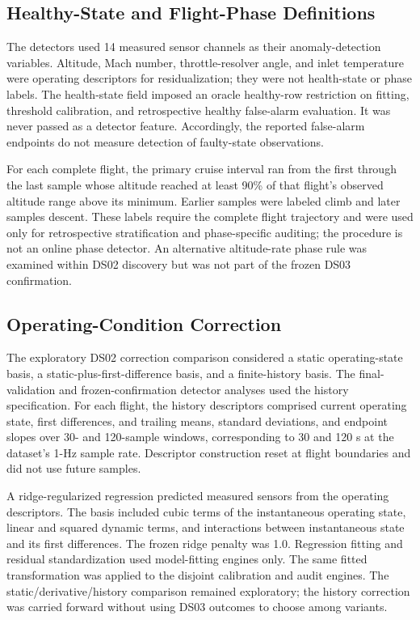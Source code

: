 \documentclass[10pt,conference]{IEEEtran}
\begin{document}
\subsection{Healthy-State and Flight-Phase Definitions}\label{healthy-state-and-flight-phase-definitions}

The detectors used 14 measured sensor channels as their anomaly-detection variables. Altitude, Mach number, throttle-resolver angle, and inlet temperature were operating descriptors for residualization; they were not health-state or phase labels. The health-state field imposed an oracle healthy-row restriction on fitting, threshold calibration, and retrospective healthy false-alarm evaluation. It was never passed as a detector feature. Accordingly, the reported false-alarm endpoints do not measure detection of faulty-state observations.

For each complete flight, the primary cruise interval ran from the first through the last sample whose altitude reached at least 90\% of that flight's observed altitude range above its minimum. Earlier samples were labeled climb and later samples descent. These labels require the complete flight trajectory and were used only for retrospective stratification and phase-specific auditing; the procedure is not an online phase detector. An alternative altitude-rate phase rule was examined within DS02 discovery but was not part of the frozen DS03 confirmation.

\subsection{Operating-Condition Correction}\label{operating-condition-correction}

The exploratory DS02 correction comparison considered a static operating-state basis, a static-plus-first-difference basis, and a finite-history basis. The final-validation and frozen-confirmation detector analyses used the history specification. For each flight, the history descriptors comprised current operating state, first differences, and trailing means, standard deviations, and endpoint slopes over 30- and 120-sample windows, corresponding to 30 and 120 s at the dataset's 1-Hz sample rate. Descriptor construction reset at flight boundaries and did not use future samples.

A ridge-regularized regression predicted measured sensors from the operating descriptors. The basis included cubic terms of the instantaneous operating state, linear and squared dynamic terms, and interactions between instantaneous state and its first differences. The frozen ridge penalty was 1.0. Regression fitting and residual standardization used model-fitting engines only. The same fitted transformation was applied to the disjoint calibration and audit engines. The static/derivative/history comparison remained exploratory; the history correction was carried forward without using DS03 outcomes to choose among variants.
\end{document}
